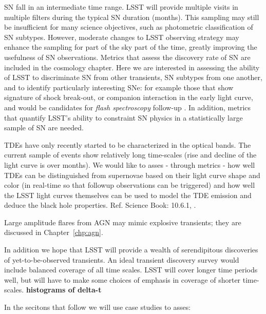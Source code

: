 SN fall in an intermediate time range.  LSST will provide
multiple visits in multiple filters during the typical SN duration
(months).  This sampling may still be insufficient for many science
objectives, such as photometric classification of SN subtypes.  
However, moderate changes to LSST
observing strategy may enhance the sampling for part of the sky part
of the time, greatly improving the usefulness of SN observations. 
Metrics that assess the discovery rate of SN are included in the
cosmology chapter. Here we are interested in assessing the ability of
LSST to discriminate SN from other transients, SN subtypes from one
another, and to identify particularly interesting SNe: for example
those that show signature of shock break-out, or companion interaction
in the early light curve, and would be candidates for \emph{flash
spectroscopy} follow-up \citep[e.g.,][]{2014Natur.509..471G}. 
In addition, metrics that
quantify LSST's ability to constraint SN physics in a statistically
large sample of SN are needed.

TDEs have only recently started to be characterized in the optical
bands. The current sample of events show relatively long
time-scales (rise and decline of the light curve is over months). We
would like to asses - through metrics - how well TDEs can be
distinguished from supernovae based on their light curve shape and
color (in real-time so that followup observations can be triggered)
and how well the LSST light curves themselves can be used to model the
TDE emission and deduce the black hole properties.  Ref. Science Book:
10.6.1, \citet{Gezari2012, Chornock2014, Arcavi2014, Holoien2014,
  Holoien2015, Holoien2016}.

Large amplitude flares from AGN may mimic
explosive transients; they are discussed in Chapter~\ref{chp:agn}.

In addition we hope that LSST will provide a wealth of serendipitous
discoveries of yet-to-be-observed transients.  An ideal transient
discovery survey would include balanced coverage of all time scales. LSST
will cover longer time periods well, but will have to make some
choices of emphasis in coverage of shorter time-scales. 
\textbf{histograms of delta-t}

In the secitons that follow we will use case studies to asses:

